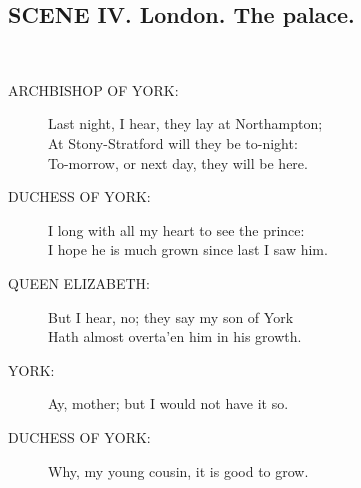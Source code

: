 \documentclass{article}
\begin{document}
\subsection*{SCENE IV.  London. The palace.}
\\
\begin{description}
\item[ARCHBISHOP OF YORK:] 
\hspace{1pt}Last night, I hear, they lay at Northampton;\\
\hspace{1pt}At Stony-Stratford will they be to-night:\\
\hspace{1pt}To-morrow, or next day, they will be here.\\
\end{description}
\begin{description}
\item[DUCHESS OF YORK:] 
\hspace{1pt}I long with all my heart to see the prince:\\
\hspace{1pt}I hope he is much grown since last I saw him.\\
\end{description}
\begin{description}
\item[QUEEN ELIZABETH:] 
\hspace{1pt}But I hear, no; they say my son of York\\
\hspace{1pt}Hath almost overta'en him in his growth.\\
\end{description}
\begin{description}
\item[YORK:] 
\hspace{1pt}Ay, mother; but I would not have it so.\\
\end{description}
\begin{description}
\item[DUCHESS OF YORK:] 
\hspace{1pt}Why, my young cousin, it is good to grow.\\
\end{description}
\end{document}
